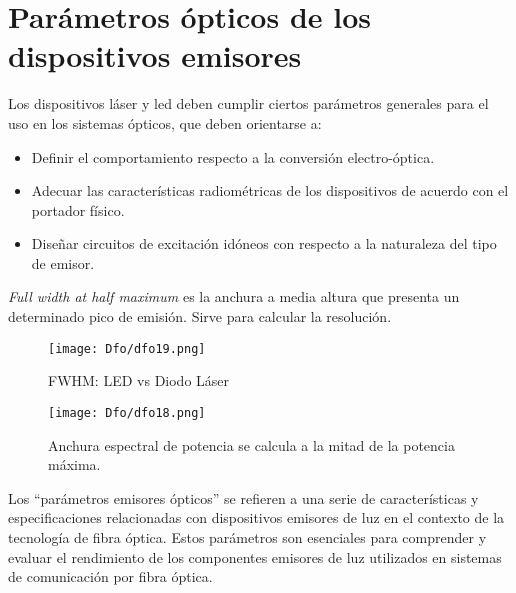 \documentclass[
	12pt, %
	fleqn, %
	a4paper, %
	oneside, %
]{LegrandOrangeBook}
\begin{document}
\section{Parámetros ópticos de los dispositivos emisores}
Los dispositivos láser y led deben cumplir ciertos parámetros generales para el uso en los sistemas ópticos, que deben orientarse a:
\begin{itemize}
\item Definir el comportamiento respecto a la conversión electro-óptica.
\item Adecuar las características radiométricas de los dispositivos de acuerdo con el portador físico.
\item Diseñar circuitos de excitación idóneos con respecto a la naturaleza del tipo de emisor.
\end{itemize}
\begin{vocabulary}[FWHM]
\textit{Full width at half maximum} es la anchura a media altura que presenta un determinado pico de emisión. Sirve para calcular la resolución.
\end{vocabulary}
\begin{figure}[H]
\centering
\texttt{[image: Dfo/dfo19.png]}
\caption{FWHM: LED vs Diodo Láser}
\end{figure}
\begin{figure}[H]
\centering
\texttt{[image: Dfo/dfo18.png]}
\caption{Anchura espectral de potencia se calcula a la mitad de la potencia máxima.}
\end{figure}
Los ``parámetros emisores ópticos'' se refieren a una serie de características y especificaciones relacionadas con dispositivos emisores de luz en el contexto de la tecnología de fibra óptica. Estos parámetros son esenciales para comprender y evaluar el rendimiento de los componentes emisores de luz utilizados en sistemas de comunicación por fibra óptica.
\end{document}
